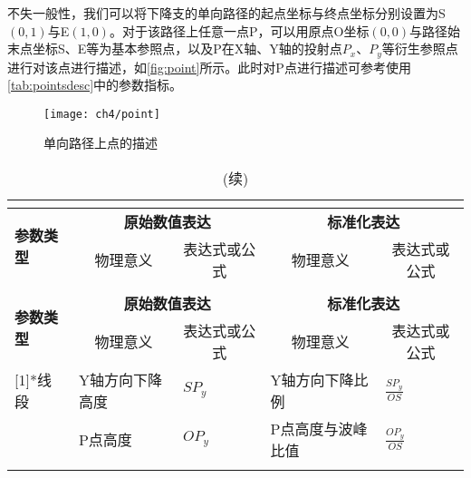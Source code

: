 不失一般性，我们可以将下降支的单向路径的起点坐标与终点坐标分别设置为S$(0,1)$与E$(1,0)$。对于该路径上任意一点P，可以用原点O坐标$(0,0)$与路径始末点坐标S、E等为基本参照点，以及P在X轴、Y轴的投射点$P_x$、$P_y$等衍生参照点
进行对该点进行描述，如\autoref{fig:point}所示。此时对P点进行描述可参考使用\autoref{tab:pointsdesc}中的参数指标。
\begin{figure}[htbp]
    \centering
    \texttt{[image: ch4/point]}
    \caption{\label{fig:point}单向路径上点的描述}
\end{figure}
\begin{center}
    \fontsize{10}{4}
    \setlength\LTleft{0pt}
    \setlength\LTright{0pt}
    \begin{longtable}{p{1.57cm}<{\centering}p{4.07cm}<{\centering}p{2.07cm}<{\centering}p{4.07cm}<{\centering}p{2.07cm}<{\centering}}
		\caption{单向路径上任意一点的描述指标一览}\\
		\label{tab:pointsdesc}\\
		\hline
        \multirow{2}[2]{*}{\textbf{参数类型}} & \multicolumn{2}{c}{\textbf{原始数值表达}} & \multicolumn{2}{c}{\textbf{标准化表达}} \\
            & \multicolumn{1}{c}{物理意义} & \multicolumn{1}{c}{表达式或公式} & \multicolumn{1}{c}{物理意义} & \multicolumn{1}{c}{表达式或公式} \\
        \hline
        \endfirsthead
        \caption[]{(续)}\\
        \hline
        \multirow{2}[2]{*}{\textbf{参数类型}} & \multicolumn{2}{c}{\textbf{原始数值表达}} & \multicolumn{2}{c}{\textbf{标准化表达}} \\
            & \multicolumn{1}{c}{物理意义} & \multicolumn{1}{c}{表达式或公式} & \multicolumn{1}{c}{物理意义} & \multicolumn{1}{c}{表达式或公式} \\
        \hline
        \endhead 
        \hline
        \endfoot
        \multirow{3}[1]{*}{线段}    & Y轴方向下降高度 &   $SP_y$    &  Y轴方向下降比例     & $\frac{SP_y}{OS}$ \\
                                & P点高度      &     $OP_y$  &    P点高度与波峰比值   & $\frac{OP_y}{OS}$ \\
                                &       &       &       &  \\

\end{longtable}
\end{center}

